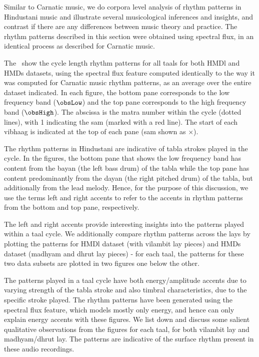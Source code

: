 Similar to Carnatic music, we do corpora level analysis of rhythm patterns in Hindustani music and illustrate several musicological inferences and insights, and contrast if there are any differences between music theory and practice. The rhythm patterns described in this section were obtained using spectral flux, in an identical process as described for Carnatic music. %

The \ show the cycle length rhythm patterns for all \glspl{taal} for both \acrshort{HMDl} and \acrshort{HMDs} datasets, using the spectral flux feature computed identically to the way it was computed for Carnatic music rhythm patterns, as an average over the entire dataset indicated. In each figure, the bottom pane corresponds to the low frequency band ($\protect\obsLow$) and the top pane corresponds to the high frequency band ($\protect\obsHigh$). The abscissa is the \gls{matra} number within the cycle (dotted lines), with 1 indicating the \gls{sam} (marked with a red line). The start of each \gls{vibhaag} is indicated at the top of each pane (\gls{sam} shown as $\times$).

The rhythm patterns in Hindustani are indicative of \gls{tabla} strokes played in the cycle. In the figures, the bottom pane that shows the low frequency band has content from the \gls{bayan} (the left bass drum) of the \gls{tabla} while the top pane has content predominantly from the \gls{dayan} (the right pitched drum) of the \gls{tabla}, but additionally from the lead melody. Hence, for the purpose of this discussion, we use the terms left and right accents to refer to the accents in rhythm patterns from the bottom and top pane, respectively. 

The left and right accents provide interesting insights into the patterns played within a \gls{taal} cycle. We additionally compare rhythm patterns across the \glspl{lay} by plotting the patterns for \acrshort{HMDl} dataset (with \gls{vilambit} \gls{lay} pieces) and \acrshort{HMDs} dataset (\gls{madhyam} and \gls{dhrut} lay pieces) - for each \gls{taal}, the patterns for these two data subsets are plotted in two figures one below the other.

The patterns played in a \gls{taal} cycle have both energy/amplitude accents due to varying strength of the \gls{tabla} stroke and also timbral characteristics, due to the specific stroke played. The rhythm patterns have been generated using the spectral flux feature, which models mostly only energy, and hence can only explain energy accents with these figures. We list down and discuss some salient qualitative observations from the figures for each \gls{taal}, for both \gls{vilambit} \gls{lay} and \gls{madhyam}/\gls{dhrut} \gls{lay}. The patterns are indicative of the surface rhythm present in these audio recordings.

